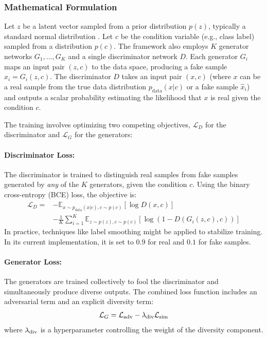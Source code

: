 \subsubsection{Mathematical Formulation}
\label{theoretical_cmadgan_math}

Let \( z \) be a latent vector sampled from a prior distribution \( p(z) \), typically a standard normal distribution . Let \( c \) be the condition variable (e.g., class label) sampled from a distribution \( p(c) \). The framework also employs \( K \) generator networks \( G_1, \dots, G_K \) and a single discriminator network \( D \). Each generator \( G_i \) maps an input pair \( (z, c) \) to the data space, producing a fake sample \( \hat{x}_i = G_i(z, c) \). The discriminator \( D \) takes an input pair \( (x, c) \) (where \( x \) can be a real sample from the true data distribution \( p_{\text{data}}(x|c) \) or a fake sample \( \hat{x}_i \)) and outputs a scalar probability estimating the likelihood that \( x \) is real given the condition \( c \).

The training involves optimizing two competing objectives, \( \mathcal{L}_D \) for the discriminator and \( \mathcal{L}_G \) for the generators:

\paragraph{Discriminator Loss:}
The discriminator is trained to distinguish real samples from fake samples generated by \textit{any} of the \( K \) generators, given the condition \( c \). Using the binary cross-entropy (BCE) loss, the objective is:
\begin{equation}
\label{eq:cmadgan_loss_d}
\begin{split}
\mathcal{L}_D = & - \mathbb{E}_{x \sim p_{\text{data}}(x|c), c \sim p(c)} [\log D(x, c)] \\
& - \frac{1}{K} \sum_{i=1}^{K} \mathbb{E}_{z \sim p(z), c \sim p(c)} [\log(1 - D(G_i(z, c), c))]
\end{split}
\end{equation}
In practice, techniques like label smoothing might be applied to stabilize training. In its current implementation, it is set to \(0.9\) for real and \(0.1\) for fake samples.

\paragraph{Generator Loss:}
The generators are trained collectively to fool the discriminator and simultaneously produce diverse outputs. The combined loss function includes an adversarial term and an explicit diversity term:
\begin{equation}
\label{eq:cmadgan_loss_g}
\mathcal{L}_G = \mathcal{L}_{\text{adv}} - \lambda_{\text{div}} \mathcal{L}_{\text{sim}}
\end{equation}
where \( \lambda_{\text{div}} \) is a hyperparameter controlling the weight of the diversity component.

